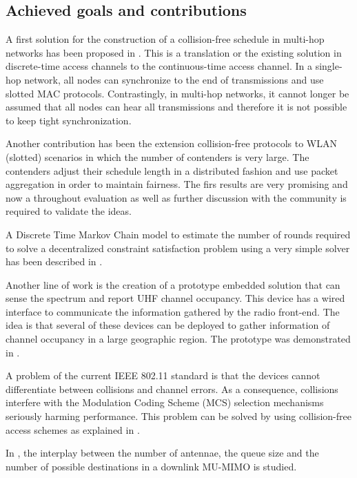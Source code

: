 \documentclass[a4paper,twocolumns]{article}%
\begin{document}
\subsection{Achieved goals and contributions}

A first solution for the construction of a collision-free schedule in multi-hop networks has been proposed in \cite{barcelo2013dcc}.
This is a translation or the existing solution in discrete-time access channels to the continuous-time access channel.
In a single-hop network, all nodes can synchronize to the end of transmissions and use slotted MAC protocols.
Contrastingly, in multi-hop networks, it cannot longer be assumed that all nodes can hear all transmissions and therefore it is not possible to keep tight synchronization.


Another contribution has been the extension collision-free protocols to WLAN (slotted) scenarios in which the number of contenders is very large.
The contenders adjust their schedule length in a distributed fashion and use packet aggregation in order to maintain fairness.
The firs results are very promising \cite{sanabria2013fec} and now a throughout evaluation as well as further discussion with the community is required to validate the ideas.

A Discrete Time Markov Chain model to estimate the number of rounds required to solve a decentralized constraint satisfaction problem using a very simple solver has been described in \cite{barcelo2012mdc}.

Another line of work is the creation of a prototype embedded solution that can sense the spectrum and report UHF channel occupancy.
This device has a wired interface to communicate the information gathered by the radio front-end.
The idea is that several of these devices can be deployed to gather information of channel occupancy in a large geographic region.
The prototype was demonstrated in \cite{sanabria2012ssu}.

A problem of the current IEEE 802.11 standard is that the devices cannot differentiate between collisions and channel errors.
As a consequence, collisions interfere with the Modulation Coding Scheme (MCS) selection mechanisms seriously harming performance.
This problem can be solved by using collision-free access schemes as explained in \cite{martorell2012pec}.

In \cite{bellalta2012ppa, bellalta2012rqp}, the interplay between the number of antennae, the queue size and the number of possible destinations in a downlink MU-MIMO is studied.
\end{document}
